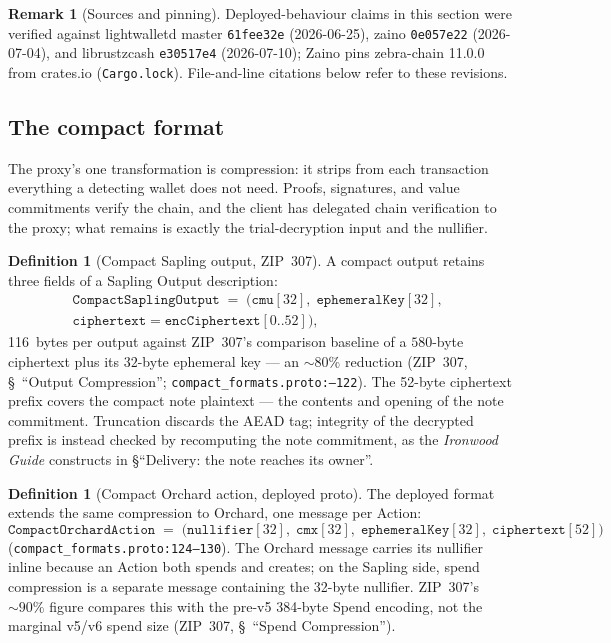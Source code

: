 \documentclass[11pt,a4paper]{article}
\theoremstyle{definition}
\newtheorem{definition}[theorem]{Definition}
\newtheorem{remark}[theorem]{Remark}
\begin{document}
\begin{remark}[Sources and pinning]\label{rem:sync-pins}
Deployed-behaviour claims in this section were verified against
\textsf{lightwalletd} master \texttt{61fee32e} (2026-06-25),
\textsf{zaino} \texttt{0e057e22} (2026-07-04), and \textsf{librustzcash}
\texttt{e30517e4} (2026-07-10); Zaino pins \textsf{zebra-chain} 11.0.0
from crates.io (\texttt{Cargo.lock}). File-and-line citations below refer
to these revisions.
\end{remark}

\subsection{The compact format}\label{sec:sync-service-compact}

The proxy's one transformation is compression: it strips from each
transaction everything a detecting wallet does not need. Proofs,
signatures, and value commitments verify the chain, and the client has
delegated chain verification to the proxy; what remains is exactly the
trial-decryption input and the nullifier.

\begin{definition}[Compact Sapling output, ZIP~307]
\label{def:sync-compact-output}
A compact output retains three fields of a Sapling Output description:
\begin{multline*}
\mathtt{CompactSaplingOutput} \;=\;
\bigl(\mathtt{cmu}[32],\; \mathtt{ephemeralKey}[32],\;\\
\mathtt{ciphertext} = \mathtt{encCiphertext}[0..52]\bigr),
\end{multline*}
116~bytes per output against ZIP~307's comparison baseline of a
$580$-byte ciphertext plus its $32$-byte ephemeral key --- an
${\sim}80\%$ reduction (ZIP~307, \S~``Output
Compression''; \texttt{compact\_\allowbreak formats.proto:--122}). The 52-byte
ciphertext prefix covers the compact note plaintext --- the contents and
opening of the note commitment. Truncation discards the AEAD tag;
integrity of the decrypted prefix is instead checked by recomputing the
note commitment, as the \emph{Ironwood Guide} constructs in
\S``Delivery: the note reaches its owner''.
\end{definition}

\begin{definition}[Compact Orchard action, deployed proto]
\label{def:sync-compact-action}
The deployed format extends the same compression to Orchard, one message
per Action:
\[
\mathtt{CompactOrchardAction} \;=\;
\bigl(\mathtt{nullifier}[32],\; \mathtt{cmx}[32],\;
\mathtt{ephemeralKey}[32],\; \mathtt{ciphertext}[52]\bigr)
\]
(\texttt{compact\_formats.proto:124--130}). The Orchard message carries
its nullifier inline because an Action both spends and creates; on the
Sapling side, spend compression is a separate message containing the
32-byte nullifier. ZIP~307's ${\sim}90\%$ figure compares this with the
pre-v5 384-byte Spend encoding, not the marginal v5/v6 spend size
(ZIP~307, \S~``Spend Compression'').
\end{definition}
\end{document}
